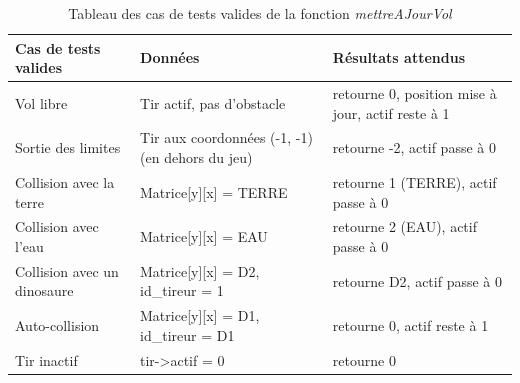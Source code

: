 \documentclass[11pt,a4paper]{article}
\begin{document}
\begin{table}[H]
    \centering
    \small %
    \begin{tabularx}{\textwidth}{|
    >{\centering\arraybackslash}p{3.2cm}|
    >{\raggedright\arraybackslash}X|
    >{\centering\arraybackslash}p{4cm}|} \hline
        \textbf{Cas de tests valides} & \centering\textbf{Données} & \textbf{Résultats attendus} \\ \hline
        Vol libre & Tir actif, pas d'obstacle & retourne 0, position mise à jour, actif reste à 1 \\ \hline
        Sortie des limites & Tir aux coordonnées (-1, -1) (en dehors du jeu) & retourne -2, actif passe à 0 \\ \hline
        Collision avec la terre & Matrice[y][x] = TERRE & retourne 1 (TERRE), actif passe à 0 \\ \hline
        Collision avec l'eau & Matrice[y][x] = EAU & retourne 2 (EAU), actif passe à 0 \\ \hline
        Collision avec  un dinosaure & Matrice[y][x] = D2, id\_tireur = 1 & retourne D2, actif passe à 0 \\ \hline
        Auto-collision & Matrice[y][x] = D1, id\_tireur = D1 & retourne 0, actif reste à 1 \\ \hline
        Tir inactif & tir->actif = 0 & retourne 0 \\ \hline
    \end{tabularx}
    \caption{Tableau des cas de tests valides de la fonction \textit{\mbox{mettreAJourVol}}}
    \label{tab_cas_valides_mettreAJourVol}
\end{table}
\end{document}
